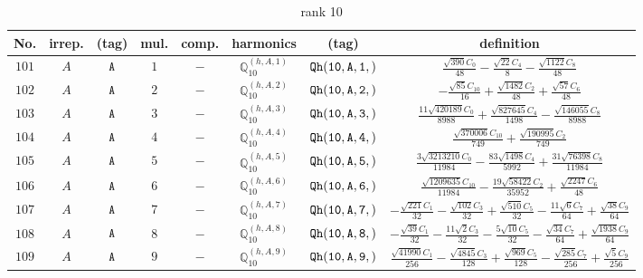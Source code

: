 \documentclass[fleqn,8pt]{jsarticle}
\begin{document}
\begin{table}[ht!]
\begin{center}
\caption{rank 10}
\renewcommand{\arraystretch}{1.3}
\begin{tabular}{cccccccc} \hline \hline
No. & irrep. & (tag) & mul. & comp. & harmonics & (tag) & definition \\ \hline
$ 101 $ & $ A $ & $ {\tt A} $ & $ 1 $ & $ - $ & $ \mathbb{Q}_{10}^{(h,A,1)} $ & $ {\tt Qh(10,A,1,)} $ & $ \frac{\sqrt{390} C_{0}}{48} - \frac{\sqrt{22} C_{4}}{8} - \frac{\sqrt{1122} C_{8}}{48} $ \\
$ 102 $ & $ A $ & $ {\tt A} $ & $ 2 $ & $ - $ & $ \mathbb{Q}_{10}^{(h,A,2)} $ & $ {\tt Qh(10,A,2,)} $ & $ - \frac{\sqrt{85} C_{10}}{16} + \frac{\sqrt{1482} C_{2}}{48} + \frac{\sqrt{57} C_{6}}{48} $ \\
$ 103 $ & $ A $ & $ {\tt A} $ & $ 3 $ & $ - $ & $ \mathbb{Q}_{10}^{(h,A,3)} $ & $ {\tt Qh(10,A,3,)} $ & $ \frac{11 \sqrt{420189} C_{0}}{8988} + \frac{\sqrt{827645} C_{4}}{1498} - \frac{\sqrt{146055} C_{8}}{8988} $ \\
$ 104 $ & $ A $ & $ {\tt A} $ & $ 4 $ & $ - $ & $ \mathbb{Q}_{10}^{(h,A,4)} $ & $ {\tt Qh(10,A,4,)} $ & $ \frac{\sqrt{370006} C_{10}}{749} + \frac{\sqrt{190995} C_{2}}{749} $ \\
$ 105 $ & $ A $ & $ {\tt A} $ & $ 5 $ & $ - $ & $ \mathbb{Q}_{10}^{(h,A,5)} $ & $ {\tt Qh(10,A,5,)} $ & $ \frac{3 \sqrt{3213210} C_{0}}{11984} - \frac{83 \sqrt{1498} C_{4}}{5992} + \frac{31 \sqrt{76398} C_{8}}{11984} $ \\
$ 106 $ & $ A $ & $ {\tt A} $ & $ 6 $ & $ - $ & $ \mathbb{Q}_{10}^{(h,A,6)} $ & $ {\tt Qh(10,A,6,)} $ & $ \frac{\sqrt{1209635} C_{10}}{11984} - \frac{19 \sqrt{58422} C_{2}}{35952} + \frac{\sqrt{2247} C_{6}}{48} $ \\
$ 107 $ & $ A $ & $ {\tt A} $ & $ 7 $ & $ - $ & $ \mathbb{Q}_{10}^{(h,A,7)} $ & $ {\tt Qh(10,A,7,)} $ & $ - \frac{\sqrt{221} C_{1}}{32} - \frac{\sqrt{102} C_{3}}{32} + \frac{\sqrt{510} C_{5}}{32} - \frac{11 \sqrt{6} C_{7}}{64} + \frac{\sqrt{38} C_{9}}{64} $ \\
$ 108 $ & $ A $ & $ {\tt A} $ & $ 8 $ & $ - $ & $ \mathbb{Q}_{10}^{(h,A,8)} $ & $ {\tt Qh(10,A,8,)} $ & $ - \frac{\sqrt{39} C_{1}}{32} - \frac{11 \sqrt{2} C_{3}}{32} - \frac{5 \sqrt{10} C_{5}}{32} - \frac{\sqrt{34} C_{7}}{64} + \frac{\sqrt{1938} C_{9}}{64} $ \\
$ 109 $ & $ A $ & $ {\tt A} $ & $ 9 $ & $ - $ & $ \mathbb{Q}_{10}^{(h,A,9)} $ & $ {\tt Qh(10,A,9,)} $ & $ \frac{\sqrt{41990} C_{1}}{256} - \frac{\sqrt{4845} C_{3}}{128} + \frac{\sqrt{969} C_{5}}{128} - \frac{\sqrt{285} C_{7}}{256} + \frac{\sqrt{5} C_{9}}{256} $ \\

\end{tabular}
\end{center}
\end{table}
\end{document}
